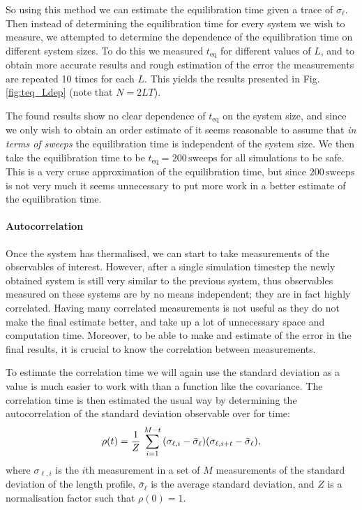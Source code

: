 So using this method we can estimate the equilibration time given a trace of $\sigma_\ell$.
Then instead of determining the equilibration time for every system we wish to measure, we attempted to determine the dependence of the equilibration time on different system sizes.
To do this we measured $t_\text{eq}$ for different values of $L$, and to obtain more accurate results and rough estimation of the error the measurements are repeated 10 times for each $L$.
This yields the results presented in Fig. \ref{fig:teq_Ldep} (note that $N = 2 L T$).

The found results show no clear dependence of $t_\text{eq}$ on the system size, and since we only wish to obtain an order estimate of it seems reasonable to assume that \emph{in terms of sweeps} the equilibration time is independent of the system size.
We then take the equilibration time to be $t_\text{eq} = 200 \, \text{sweeps}$ for all simulations to be safe.
This is a very cruse approximation of the equilibration time, but since $200 \,\text{sweeps}$ is not very much it seems unnecessary to put more work in a better estimate of the equilibration time.

\paragraph{Autocorrelation}
Once the system has thermalised, we can start to take measurements of the observables of interest.
However, after a single simulation timestep the newly obtained system is still very similar to the previous system, thus observables measured on these systems are by no means independent; they are in fact highly correlated.
Having many correlated measurements is not useful as they do not make the final estimate better, and take up a lot of unnecessary space and computation time.
Moreover, to be able to make and estimate of the error in the final results, it is crucial to know the correlation between measurements.

To estimate the correlation time we will again use the standard deviation as a value is much easier to work with than a function like the covariance.
The correlation time is then estimated the usual way by determining the autocorrelation of the standard deviation observable over for time:
\begin{equation*}
    \rho(t) = \frac{1}{Z} \, \sum_{i = 1}^{M - t} \qty(\sigma_{\ell, i} - \bar{\sigma}_\ell) \qty(\sigma_{\ell, i + t} - \bar{\sigma}_\ell),
\end{equation*}
where $\sigma_{\ell, i}$ is the $i$th measurement in a set of $M$ measurements of the standard deviation of the length profile, $\bar \sigma_\ell$ is the average standard deviation, and $Z$ is a normalisation factor such that $\rho(0) = 1$.

